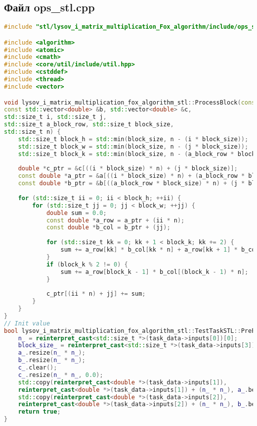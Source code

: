 \documentclass[12pt,a4paper]{extarticle}
\begin{document}
\subsection*{Файл ops\_stl.cpp}
\begin{lstlisting}[language=C++]
#include "stl/lysov_i_matrix_multiplication_Fox_algorithm/include/ops_stl.hpp"

#include <algorithm>
#include <atomic>
#include <cmath>
#include <core/util/include/util.hpp>
#include <cstddef>
#include <thread>
#include <vector>

void lysov_i_matrix_multiplication_fox_algorithm_stl::ProcessBlock(const std::vector<double> &a,
const std::vector<double> &b, std::vector<double> &c,
std::size_t i, std::size_t j,
std::size_t a_block_row, std::size_t block_size,
std::size_t n) {
	std::size_t block_h = std::min(block_size, n - (i * block_size));
	std::size_t block_w = std::min(block_size, n - (j * block_size));
	std::size_t block_k = std::min(block_size, n - (a_block_row * block_size));
	
	double *c_ptr = &c[((i * block_size) * n) + (j * block_size)];
	const double *a_ptr = &a[((i * block_size) * n) + (a_block_row * block_size)];
	const double *b_ptr = &b[((a_block_row * block_size) * n) + (j * block_size)];
	
	for (std::size_t ii = 0; ii < block_h; ++ii) {
		for (std::size_t jj = 0; jj < block_w; ++jj) {
			double sum = 0.0;
			const double *a_row = a_ptr + (ii * n);
			const double *b_col = b_ptr + (jj);
			
			for (std::size_t kk = 0; kk + 1 < block_k; kk += 2) {
				sum += a_row[kk] * b_col[kk * n] + a_row[kk + 1] * b_col[(kk + 1) * n];
			}
			if (block_k % 2 != 0) {
				sum += a_row[block_k - 1] * b_col[(block_k - 1) * n];
			}
			
			c_ptr[(ii * n) + jj] += sum;
		}
	}
}
// Init value
bool lysov_i_matrix_multiplication_fox_algorithm_stl::TestTaskSTL::PreProcessingImpl() {
	n_ = reinterpret_cast<std::size_t *>(task_data->inputs[0])[0];
	block_size_ = reinterpret_cast<std::size_t *>(task_data->inputs[3])[0];
	a_.resize(n_ * n_);
	b_.resize(n_ * n_);
	c_.clear();
	c_.resize(n_ * n_, 0.0);
	std::copy(reinterpret_cast<double *>(task_data->inputs[1]),
	reinterpret_cast<double *>(task_data->inputs[1]) + (n_ * n_), a_.begin());
	std::copy(reinterpret_cast<double *>(task_data->inputs[2]),
	reinterpret_cast<double *>(task_data->inputs[2]) + (n_ * n_), b_.begin());
	return true;
}


\end{lstlisting}
\end{document}

